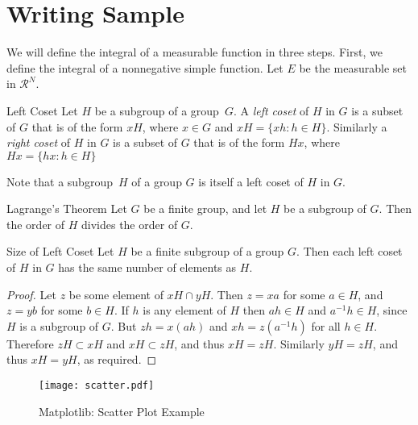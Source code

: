 \documentclass[noanswer,fancy,blue,11pt,hide]{elegantbook}
\begin{document}
\section{Writing Sample}

We will define the integral of a measurable function in three steps. First, we define the integral of a nonnegative simple function. Let $E$ be the measurable set in $\mathcal{R}^N$.

\begin{definition}{Left Coset}{}
Let $H$ be a subgroup of a group~$G$.  A \emph{left coset} of $H$ in $G$ is a subset of $G$ that is of the form $xH$, where $x \in G$ and $xH = \{ xh : h \in H \}$. Similarly a \emph{right coset} of $H$ in $G$ is a subset of $G$ that is of the form $Hx$, where $Hx = \{ hx : h \in H \}$
\end{definition}

\begin{note}
Note that a subgroup~$H$ of a group $G$ is itself a left coset of $H$ in $G$.
\end{note}

\lipsum[2]

\begin{theorem}{Lagrange's Theorem}{}
Let $G$ be a finite group, and let $H$ be a subgroup of $G$.  Then the order of $H$ divides the order of $G$.
\end{theorem}

\lipsum[3]

   
\begin{proposition}{Size of Left Coset}{}
Let $H$ be a finite subgroup of a group $G$.  Then each left coset of $H$ in $G$ has the same number of elements as $H$.
\end{proposition}

\begin{proof}
Let $z$ be some element of $xH \cap yH$.  Then $z = xa$ for some $a \in H$, and $z = yb$ for some $b \in H$. If $h$ is any element of $H$ then $ah \in H$ and $a^{-1}h \in H$, since $H$ is a subgroup of $G$. But $zh = x(ah)$ and $xh = z(a^{-1}h)$ for all $h \in H$. Therefore $zH \subset xH$ and $xH \subset zH$, and thus $xH = zH$.  Similarly $yH = zH$, and thus $xH = yH$, as required.
\end{proof}

\begin{figure}[htbp]
	\centering
	\texttt{[image: scatter.pdf]}
	\caption{Matplotlib: Scatter Plot Example\label{fig:scatter}}
\end{figure}
\end{document}
